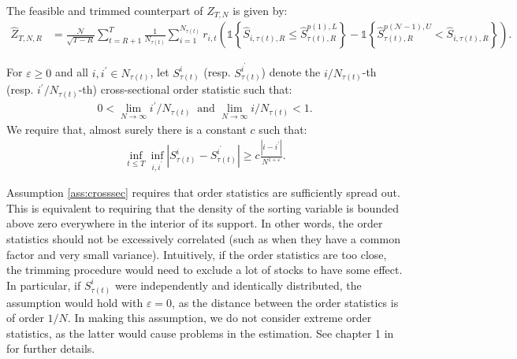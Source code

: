 \begin{definition}
\label{def: Ztilde}
	The feasible and trimmed counterpart of $Z_{T,N}$ is given by:
	\begin{align*}
		\widehat{Z}_{T,N,R} &=\frac{\mathcal{N}}{\sqrt{T-R}}\sum_{t=R+1}^{T}\frac{1}{N_{\tau(t)}}\sum_{i=1}^{N_{\tau(t)}}r_{i,t}\left( \mathds{1} \left\{ \widehat{S}_{i,\tau(t),R}\leq \widehat{S}_{\tau(t),R}^{p(1),L} \right\} - \mathds{1}\left\{  \widehat{S}_{\tau(t),R}^{p(\mathcal{N}-1),U} < \widehat{S}_{i,\tau(t),R}\right\} \right).
	\end{align*}
\end{definition}

\begin{assumption}
\label{ass:crosssec} 
For $\varepsilon \geq 0$ and all $i,i^{\prime }\in N_{\tau(t)}$, let $S_{\tau(t) }^{i}$ (resp. $S_{\tau(t) }^{i^{\prime }}$) denote the $i/N_{\tau(t) }$-th (resp. $i^{\prime }/N_{\tau(t) }$-th) cross-sectional order statistic such that:
\begin{align*}
0<\lim_{N\rightarrow \infty }i^{\prime }/N_{\tau(t) }\ \text{ and }\lim_{N\rightarrow \infty }i/N_{\tau(t) }<1. 
\end{align*}
We require that, almost surely there is a constant $c$ such that: 
\begin{align*}
\inf_{t\leq T}\inf_{i,i^{\prime }}\left\vert S_{\tau(t)}^{i}-S_{\tau(t) }^{i^{\prime }}\right\vert \geq c \frac{\left\vert i-i^{\prime }\right\vert }{N^{1+\varepsilon }}. 
\end{align*}
\end{assumption}

\noindent
Assumption \ref{ass:crosssec} requires that order statistics are sufficiently spread out. This is equivalent to requiring that the density of the sorting variable is bounded above zero everywhere in the interior of its support. In other words, the order statistics should not be excessively correlated (such as when they have a common factor and very small variance). Intuitively, if the order statistics are too close, the trimming procedure would need to exclude a lot of stocks to have some effect. In particular, if $S_{\tau(t)}^i$ were independently and identically distributed, the assumption would hold with $\varepsilon =0$, as the distance between the order statistics is of order $1/N$. In making this assumption, we do not consider extreme order statistics, as the latter would cause problems in the estimation. See chapter 1 in \cite{reiss2012approximate} for further details.

